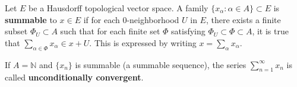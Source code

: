 Let $E$ be a Hausdorff topological vector space. A family $\{x_\alpha : \alpha \in A\} \subset E$ is \textbf{summable} to $x \in E$ if for each $0$-neighborhood $U$ in $E$, there exists a finite subset $\Phi_U \subset A$ such that for each finite set $\Phi$ satisfying $\Phi_U \subset \Phi \subset A$, it is true that $\sum_{\alpha \in \Phi} x_\alpha \in x + U$. This is expressed by writing $x = \sum_{\alpha} x_\alpha$.

If $A = \mathbb{N}$ and $\{x_n\}$ is summable (a summable sequence), the series $\sum_{n=1}^{\infty} x_n$ is called \textbf{unconditionally convergent}.

